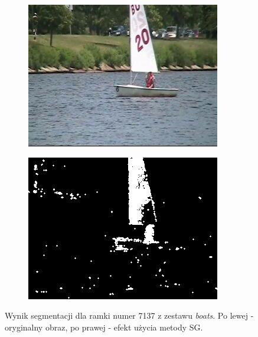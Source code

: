 \begin{figure}[!h]
\centering
\begin{subfigure}[b]{0.4\textwidth}
\includegraphics[width=\textwidth]{img/fg}
\caption{}
\end{subfigure}
\quad
\begin{subfigure}[b]{0.4\textwidth}
\includegraphics[width=\textwidth]{img/SG}
\caption{}
\end{subfigure}
\caption{Wynik segmentacji dla ramki numer 7137 z zestawu \textit{boats}. Po lewej - oryginalny obraz, po prawej - efekt użycia metody SG.\label{fig:SG}}
\end{figure}

